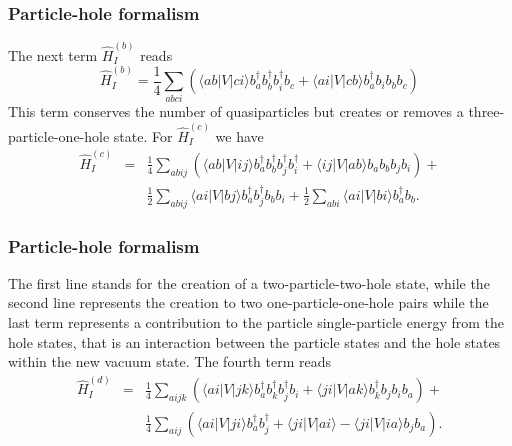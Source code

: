 \documentclass[compress]{beamer}
\newcommand*{\ket}[1]{|#1\rangle}
\newcommand*{\bra}[1]{\langle#1|}
\newcommand{\element}[3]
        {\bra{#1}#2\ket{#3}}
\begin{document}
{
  \frametitle{Particle-hole formalism}
\begin{small}
{\scriptsize
The next term $\hat{H}_I^{(b)}$  reads
\begin{equation}
	 \hat{H}_I^{(b)} = \frac{1}{4} \sum_{abci}\left(\element{ab}{V}{ci}b_a^\dagger b_b^\dagger b_i^\dagger b_c +\element{ai}{V}{cb}
		b_a^\dagger b_i b_b b_c\right) \label{eq:2-67b}
\end{equation}
This term conserves the number of quasiparticles but creates or removes a 
three-particle-one-hole  state. 
For $\hat{H}_I^{(c)}$  we have
\begin{eqnarray}
	\hat{H}_I^{(c)}& =& \frac{1}{4}
		\sum_{abij}\left(\element{ab}{V}{ij}b_a^\dagger b_b^\dagger b_j^\dagger b_i^\dagger +
		\element{ij}{V}{ab}b_a  b_b b_j b_i \right)+  \nonumber \\
	&&	\frac{1}{2}\sum_{abij}\element{ai}{V}{bj}b_a^\dagger b_j^\dagger b_b b_i + 
		\frac{1}{2}\sum_{abi}\element{ai}{V}{bi}b_a^\dagger b_b. \label{eq:2-68c}
\end{eqnarray}
}
\end{small}
}


\frame
{
  \frametitle{Particle-hole formalism}
\begin{small}
{\scriptsize
The first line stands for the creation of a two-particle-two-hole state, while the second line represents
the creation to two one-particle-one-hole pairs
while the last term represents a contribution to the particle single-particle energy
from the hole states, that is an interaction between the particle states and the hole states
within the new vacuum  state.
The fourth term reads
\begin{eqnarray}
	 \hat{H}_I^{(d)}& = &\frac{1}{4} 
	 	\sum_{aijk}\left(\element{ai}{V}{jk}b_a^\dagger b_k^\dagger b_j^\dagger b_i+
\element{ji}{V}{ak}b_k^\dagger b_j b_i b_a\right)+\nonumber \\
&&\frac{1}{4}\sum_{aij}\left(\element{ai}{V}{ji}b_a^\dagger b_j^\dagger+
\element{ji}{V}{ai} - \element{ji}{V}{ia}b_j b_a \right). \label{eq:2-69d} 
\end{eqnarray}
}
\end{small}
}
\end{document}
